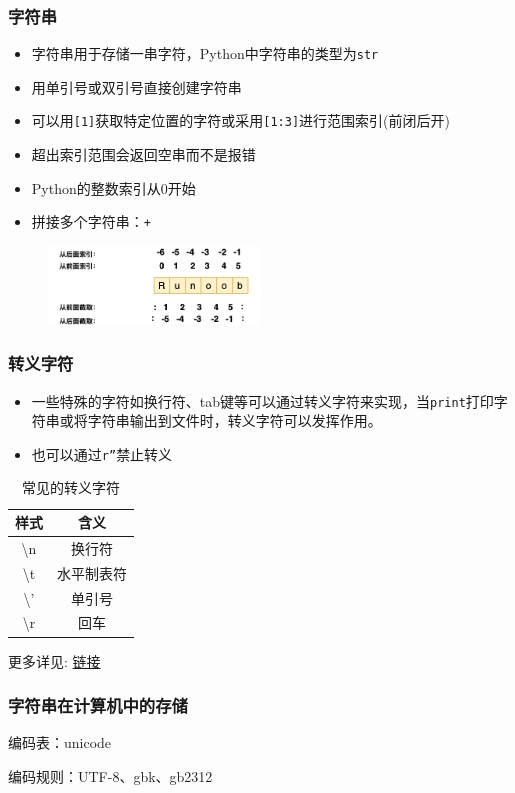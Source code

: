 \documentclass[10pt]{beamer}
\begin{document}
\begin{frame}
\frametitle{字符串}

\begin{itemize}
    \item 字符串用于存储一串字符，Python中字符串的类型为\texttt{str}
    \item 用单引号或双引号直接创建字符串
    \item 可以用\texttt{[1]}获取特定位置的字符或采用\texttt{[1:3]}进行范围索引(前闭后开)
    \item 超出索引范围会返回空串而不是报错
    \item Python的整数索引从0开始
    \item 拼接多个字符串：\texttt{+}
\end{itemize}

\begin{figure}
    \centering
    \includegraphics[width=0.5\textwidth]{figures/str_index.jpg}
\end{figure}
\end{frame}

\begin{frame}
    \frametitle{转义字符}

\begin{itemize}
    \item         一些特殊的字符如换行符、tab键等可以通过转义字符来实现，当\texttt{print}打印字符串或将字符串输出到文件时，转义字符可以发挥作用。
    \item 也可以通过\texttt{r''}禁止转义
\end{itemize}

    \begin{table}
        \caption{常见的转义字符}
    \begin{tabular}{cc}
    \toprule
    样式 & 含义 \\ \midrule
    \textbackslash n & 换行符 \\
    \textbackslash t & 水平制表符 \\
    \textbackslash ' & 单引号 \\
    \textbackslash r & 回车 \\
    \bottomrule
    \end{tabular}
    \end{table}

    更多详见: \href{https://www.scaler.com/topics/escape-sequence-in-python/}{链接}

\end{frame}

\begin{frame}
    \frametitle{字符串在计算机中的存储}

    编码表：unicode

    编码规则：UTF-8、gbk、gb2312

\end{frame}
\end{document}
